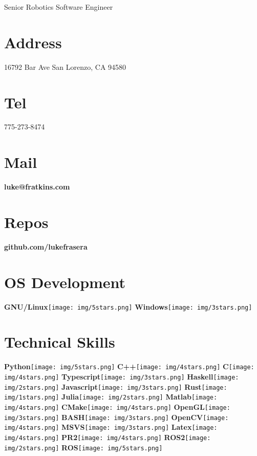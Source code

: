 \documentclass[9pt]{friggeri-cv}
\begin{document}
      {Senior Robotics Software Engineer}
      

\begin{aside}
  \section{Address}
    16792 Bar Ave San Lorenzo, CA 94580
    ~
  \section{Tel}
    775-273-8474
    ~
  \section{Mail}
    \textbf{luke@fratkins.com}
    ~
  \section{Repos}
    \textbf{github.com/lukefrasera}
    ~
  \section{OS Development}
    \textbf{GNU/Linux}\texttt{[image: img/5stars.png]}
    \textbf{Windows}\texttt{[image: img/3stars.png]}
    ~
  \section{Technical Skills}
  \textbf{Python}\texttt{[image: img/5stars.png]}
    \textbf{C++}\texttt{[image: img/4stars.png]}
    \textbf{C}\texttt{[image: img/4stars.png]}
    \textbf{Typescript}\texttt{[image: img/3stars.png]}
    \textbf{Haskell}\texttt{[image: img/2stars.png]}
    \textbf{Javascript}\texttt{[image: img/3stars.png]}
    \textbf{Rust}\texttt{[image: img/1stars.png]}
    \textbf{Julia}\texttt{[image: img/2stars.png]}
    \textbf{Matlab}\texttt{[image: img/4stars.png]}
    \textbf{CMake}\texttt{[image: img/4stars.png]}
    \textbf{OpenGL}\texttt{[image: img/3stars.png]}
    \textbf{BASH}\texttt{[image: img/3stars.png]}
    \textbf{OpenCV}\texttt{[image: img/4stars.png]}
    \textbf{MSVS}\texttt{[image: img/3stars.png]}
    \textbf{Latex}\texttt{[image: img/4stars.png]}
    \textbf{PR2}\texttt{[image: img/4stars.png]}
    \textbf{ROS2}\texttt{[image: img/2stars.png]}
    \textbf{ROS}\texttt{[image: img/5stars.png]}
    ~
\end{aside}
\end{document}
